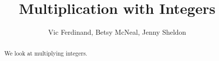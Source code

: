 \documentclass{ximera}
\title{Multiplication with Integers}
\author{Vic Ferdinand, Betsy McNeal, Jenny Sheldon}
\begin{document}
\begin{abstract}
We look at multiplying integers.
\end{abstract}
\maketitle
\end{document}
